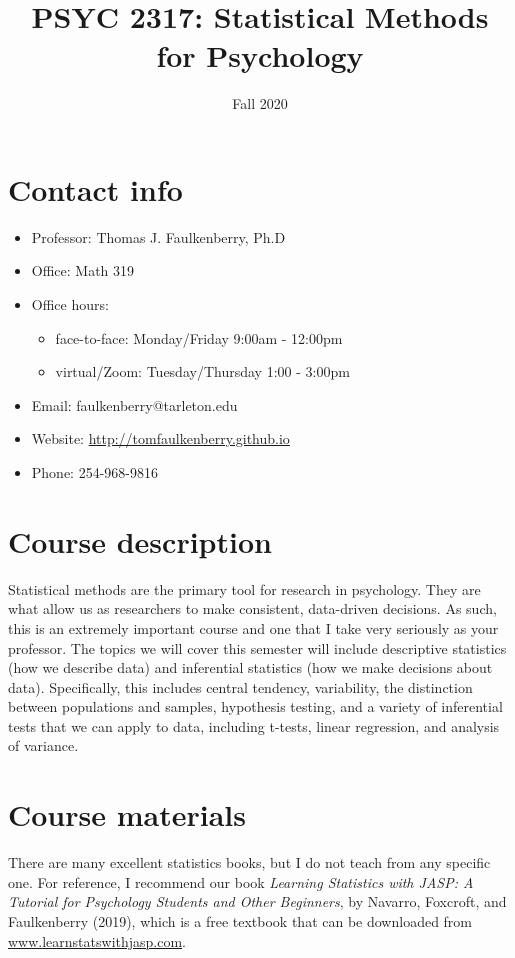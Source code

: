 \documentclass[10pt]{article}
\date{Fall 2020}
\title{PSYC 2317: Statistical Methods for Psychology}
\begin{document}
\maketitle

\section*{Contact info}
\label{sec:org71ee5ec}
\begin{itemize}
\item Professor: Thomas J. Faulkenberry, Ph.D
\item Office: Math 319
\item Office hours: 
\begin{itemize}
\item face-to-face: Monday/Friday 9:00am - 12:00pm
\item virtual/Zoom: Tuesday/Thursday 1:00 - 3:00pm
\end{itemize}
\item Email: faulkenberry@tarleton.edu
\item Website: \url{http://tomfaulkenberry.github.io}
\item Phone: 254-968-9816
\end{itemize}

\section*{Course description}
\label{sec:org2fa9ee5}

Statistical methods are the primary tool for research in psychology. They are what allow us as researchers to make consistent, data-driven decisions.  As such, this is an extremely important course and one that I take very seriously as your professor. The topics we will cover this semester will include descriptive statistics (how we describe data) and inferential statistics (how we make decisions about data).  Specifically, this includes central tendency, variability, the distinction between populations and samples, hypothesis testing, and a variety of inferential tests that we can apply to data, including t-tests, linear regression, and analysis of variance.

\section*{Course materials}
\label{sec:orgff84c0d}
There are many excellent statistics books, but I do not teach from any specific one. For reference, I recommend our book \emph{Learning Statistics with JASP: A Tutorial for Psychology Students and Other Beginners}, by Navarro, Foxcroft, and Faulkenberry (2019), which is a free textbook that can be downloaded from \href{http://learnstatswithjasp.com}{www.learnstatswithjasp.com}.
\end{document}
